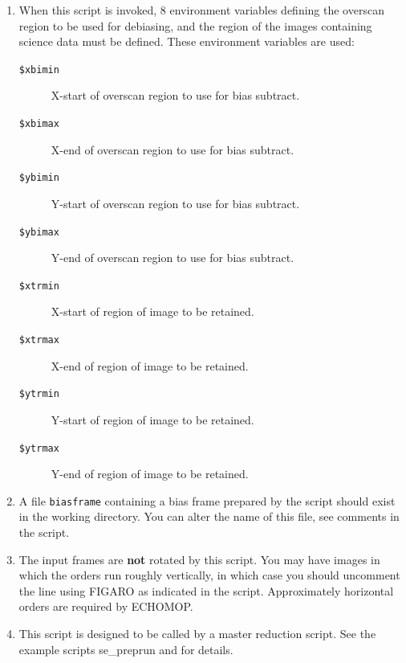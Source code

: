 \documentclass[twoside,11pt]{starlink}
\begin{document}
\begin{description}
\begin{enumerate}
\item When this script is invoked, 8 environment variables defining
      the overscan region to be used for debiasing, and the region
      of the images containing science data must be defined.
      These environment variables are used:

\begin{description}

\item [{\tt{\$xbimin}}]
           X-start of overscan region to use for bias subtract.

\item [{\tt{\$xbimax}}]
           X-end of overscan region to use for bias subtract.

\item [{\tt{\$ybimin}}]
           Y-start of overscan region to use for bias subtract.

\item [{\tt{\$ybimax}}]
           Y-end of overscan region to use for bias subtract.

\item [{\tt{\$xtrmin}}]
           X-start of region of image to be retained.

\item [{\tt{\$xtrmax}}]
           X-end of region of image to be retained.

\item [{\tt{\$ytrmin}}]
           Y-start of region of image to be retained.

\item [{\tt{\$ytrmax}}]
           Y-end of region of image to be retained.

\end{description}

\item A file \verb+biasframe+ containing a bias frame prepared by the
      script  should exist in the
      working directory.
      You can alter the name of this file, see comments in the
      script.

\item The input frames are \textbf{not} rotated by this script.  You may
      have images in which the orders run roughly vertically,
      in which case you should uncomment the line using FIGARO
       as indicated in the script.
      Approximately horizontal orders are required by ECHOMOP.

\item This script is designed to be called by a master reduction
      script.  See the example scripts 
      {se_preprun}
      and  for details.

\end{enumerate}
\end{description}
\end{document}
